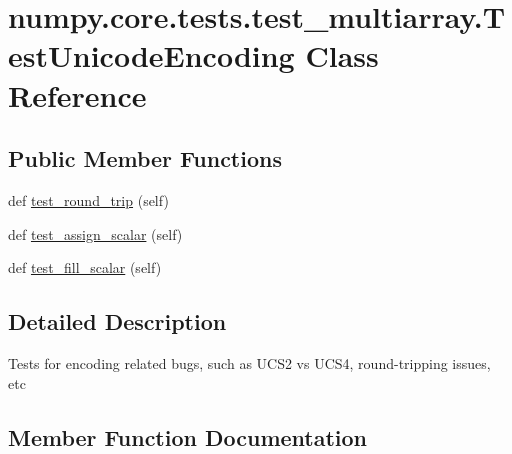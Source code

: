 \hypertarget{classnumpy_1_1core_1_1tests_1_1test__multiarray_1_1TestUnicodeEncoding}{}\section{numpy.\+core.\+tests.\+test\+\_\+multiarray.\+Test\+Unicode\+Encoding Class Reference}
\label{classnumpy_1_1core_1_1tests_1_1test__multiarray_1_1TestUnicodeEncoding}
\subsection*{Public Member Functions}
\begin{DoxyCompactItemize}
\item 
def \hyperlink{classnumpy_1_1core_1_1tests_1_1test__multiarray_1_1TestUnicodeEncoding_a61c9319e0d66cb8360fc88a4d1f3f8b8}{test\+\_\+round\+\_\+trip} (self)
\item 
def \hyperlink{classnumpy_1_1core_1_1tests_1_1test__multiarray_1_1TestUnicodeEncoding_a218cdd62b19ea076cffb5cb4411b3ed9}{test\+\_\+assign\+\_\+scalar} (self)
\item 
def \hyperlink{classnumpy_1_1core_1_1tests_1_1test__multiarray_1_1TestUnicodeEncoding_ae2ab7fb12c8b89ad5fde8a42279d849a}{test\+\_\+fill\+\_\+scalar} (self)
\end{DoxyCompactItemize}


\subsection{Detailed Description}
\begin{DoxyVerb}Tests for encoding related bugs, such as UCS2 vs UCS4, round-tripping
issues, etc
\end{DoxyVerb}
 

\subsection{Member Function Documentation}
\mbox{\label{classnumpy_1_1core_1_1tests_1_1test__multiarray_1_1TestUnicodeEncoding_a218cdd62b19ea076cffb5cb4411b3ed9}} 
